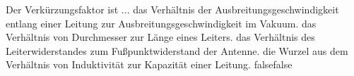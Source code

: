     {Der Verkürzungsfaktor ist ...}
    {das Verhältnis der Ausbreitungsgeschwindigkeit entlang einer Leitung zur Ausbreitungsgeschwindigkeit im Vakuum.}
    {das Verhältnis von Durchmesser zur Länge eines Leiters.}
    {das Verhältnis des Leiterwiderstandes zum Fußpunktwiderstand der Antenne.}
    {die Wurzel aus dem Verhältnis von Induktivität zur Kapazität einer Leitung.}
    {false}{false}